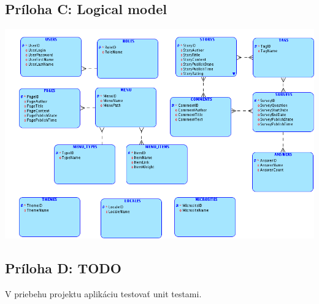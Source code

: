 \documentclass[a4paper,titlepage,11pt]{article}
\begin{document}
\subsection*{Príloha C: Logical model}
\includegraphics[width=\textwidth]{schema.png}

\subsection*{Príloha D: TODO}
V priebehu projektu aplikáciu testovať unit testami.
\end{document}
